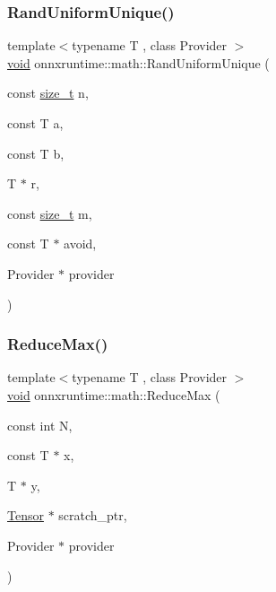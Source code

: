 \mbox{\label{namespaceonnxruntime_1_1math_ac5727151c383866edef13ee7a9edd138}} 
\subsubsection{\texorpdfstring{Rand\+Uniform\+Unique()}{RandUniformUnique()}}
{\footnotesize\ttfamily template$<$typename T , class Provider $>$ \\
\mbox{\hyperlink{mlasi_8h_a88f941d423cb2a819b70a1358982b1a6}{void}} onnxruntime\+::math\+::\+Rand\+Uniform\+Unique (\begin{DoxyParamCaption}\item[{const \mbox{\hyperlink{mlasi_8h_a503efbc1c6e50825320ad909366b78ab}{size\+\_\+t}}}]{n,  }\item[{const T}]{a,  }\item[{const T}]{b,  }\item[{T $\ast$}]{r,  }\item[{const \mbox{\hyperlink{mlasi_8h_a503efbc1c6e50825320ad909366b78ab}{size\+\_\+t}}}]{m,  }\item[{const T $\ast$}]{avoid,  }\item[{Provider $\ast$}]{provider }\end{DoxyParamCaption})}

\mbox{\label{namespaceonnxruntime_1_1math_afd4d86c778cf69822751d1de899b0ac1}} 
\subsubsection{\texorpdfstring{Reduce\+Max()}{ReduceMax()}}
{\footnotesize\ttfamily template$<$typename T , class Provider $>$ \\
\mbox{\hyperlink{mlasi_8h_a88f941d423cb2a819b70a1358982b1a6}{void}} onnxruntime\+::math\+::\+Reduce\+Max (\begin{DoxyParamCaption}\item[{const int}]{N,  }\item[{const T $\ast$}]{x,  }\item[{T $\ast$}]{y,  }\item[{\mbox{\hyperlink{classonnxruntime_1_1Tensor}{Tensor}} $\ast$}]{scratch\+\_\+ptr,  }\item[{Provider $\ast$}]{provider }\end{DoxyParamCaption})}

